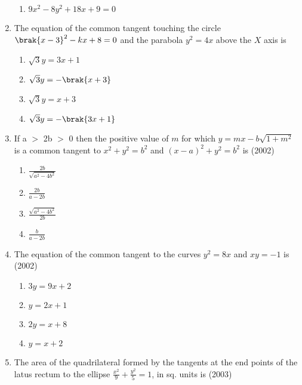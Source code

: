 \begin{enumerate}
\begin{multicols}{2}
\begin{enumerate}
    \item $9x^2-8y^2+18x+9=0$
\end{enumerate}
\end{multicols}
\item The equation of the common tangent touching the circle $\brak{x-3}^2-kx+8=0$ and the parabola $y^2=4x$ above the $X$ axis is 
      \hfill{}
\begin{multicols}{2}
\begin{enumerate}
    \item $\sqrt{3}y=3x+1$
    \item $\sqrt{3}y=-\brak{x+3}$
    \item $\sqrt{3}y=x+3$
    \item $\sqrt{3}y=-\brak{3x+1}$
\end{enumerate}
\end{multicols}
\item If a $>$ 2b $>$ 0 then the positive value of $m$ for which       $y=mx-b\sqrt{1+m^{2}} $ is a common tangent to $x^{2} + y^{2} = b^{2} $ and  $(x-a)^{2} + y^{2} = b^{2}$ is   \hfill {(2002)}
\begin{multicols}{4}
\begin{enumerate}
    \item $\frac{2b}{\sqrt{a^{2}-4b^{2}}}$
    \item $\frac{2b}{a-2b}$
    \item $\frac{\sqrt{a^{2}-4b^{2}}}{2b}$
    \item $\frac{b}{a-2b}$
\end{enumerate}
\end{multicols}
\item The equation of the common tangent to the curves $y^{2}=8x$ and $xy=-1$ is \hfill{(2002)}
\begin{multicols}{4}
\begin{enumerate}
    \item $3y=9x+2$
    \item $y=2x+1$
    \item $2y=x+8$
    \item $y=x+2$
\end{enumerate}
\end{multicols}
\item The area of the quadrilateral formed by the tangents at the end points of the latus rectum to the ellipse $\frac{x^{2}}{9}+\frac{y^{2}}{5}=1$, in sq. units is \hfill{(2003)}
 \begin{multicols}{4}
\begin{enumerate}

\end{enumerate}
\end{multicols}
\end{enumerate}
